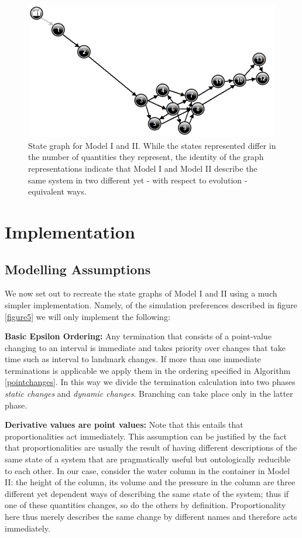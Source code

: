 \documentclass{article}
\begin{document}
\begin{figure}
	\centering
	\includegraphics[scale=0.9]{Simple_State_Graph.png}
	\caption{State graph for Model I and II. While the states represented differ in the number of quantities they represent, the identity of the graph representations indicate that Model I and Model II describe the same system in two different yet - with respect to evolution - equivalent ways.}
	\label{figure7}
\end{figure}

\section{Implementation}

\subsection{Modelling Assumptions}

We now set out to recreate the state graphs of Model I and II using a much simpler implementation. Namely, of the simulation preferences described in figure \ref{figure5} we will only implement the following:


\textbf{Basic Epsilon Ordering:} Any termination that consists of a point-value changing to an interval is immediate and takes priority over changes that take time such as interval to landmark changes. If more than one immediate terminations is applicable we apply them in the ordering specified in Algorithm \ref{pointchanges}. In this way we divide the termination calculation into two phases \textit{static changes} and \textit{dynamic changes}. Branching can take place only in the latter phase.

\textbf{Derivative values are point values:} Note that this entails that proportionalities act immediately. This assumption can be justified by the fact that proportionalities are usually the result of having different descriptions of the same state of a system that are pragmatically useful but ontologically reducible to each other. In our case, consider the water column in the container in Model II: the height of the column, its volume and the pressure in the column are three different yet dependent ways of describing the same state of the system; thus if one of these quantities changes, so do the others by definition. Proportionality here thus merely describes the same change by different names and therefore acts immediately.
\end{document}
